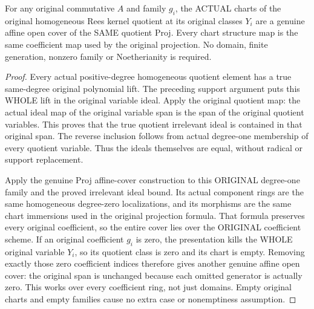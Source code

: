 \begin{theorem}
\label{scheme:actual-rees-coordinate-cover}
\leanok
{}
For any original commutative $A$ and family $g_i$, the ACTUAL charts of the
original homogeneous Rees kernel quotient at its original classes $Y_i$
are a genuine affine open cover of the SAME quotient Proj. Every chart
structure map is the same coefficient map used by the original projection.
No domain, finite generation, nonzero family or Noetherianity is required.
\end{theorem}
\begin{proof}
Every actual positive-degree homogeneous quotient element has a true
same-degree original polynomial lift. The preceding support argument puts
this WHOLE lift in the original variable ideal. Apply the original quotient
map: the actual ideal map of the original variable span is the span of the
original quotient variables. This proves that the true quotient irrelevant
ideal is contained in that original span. The reverse inclusion follows
from actual degree-one membership of every quotient variable. Thus the
ideals themselves are equal, without radical or support replacement.

Apply the genuine Proj affine-cover construction to this ORIGINAL degree-one
family and the proved irrelevant ideal bound. Its actual component rings
are the same homogeneous degree-zero localizations, and its morphisms are
the same chart immersions used in the original projection formula. That
formula preserves every original coefficient, so the entire cover lies
over the ORIGINAL coefficient scheme. If an original coefficient $g_i$ is
zero, the presentation kills the WHOLE original variable $Y_i$, so its
quotient class is zero and its chart is empty. Removing exactly those zero
coefficient indices therefore gives another genuine affine open cover:
the original span is unchanged because each omitted generator is actually
zero. This works over every coefficient ring, not just domains. Empty
original charts and empty families cause no extra case or nonemptiness
assumption.
\end{proof}

